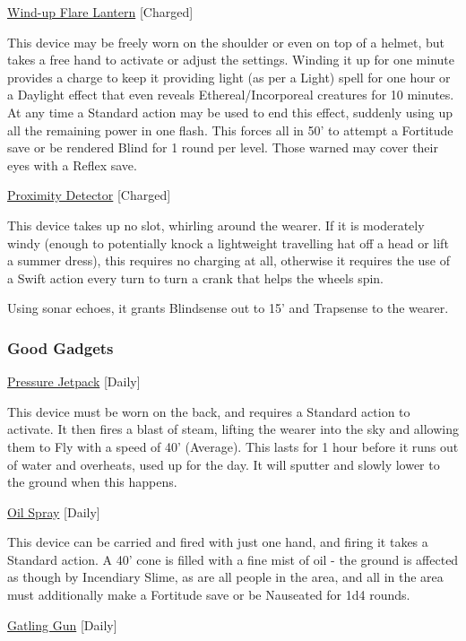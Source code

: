 \medskip\noindent\underline{Wind-up Flare Lantern} [Charged]

\noindent This device may be freely worn on the shoulder or even on top of a helmet, but takes a free hand to activate or adjust the settings. Winding it up for one minute provides a charge to keep it providing light (as per a Light) spell for one hour or a Daylight effect that even reveals Ethereal/Incorporeal creatures for 10 minutes. At any time a Standard action may be used to end this effect, suddenly using up all the remaining power in one flash. This forces all in 50' to attempt a Fortitude save or be rendered Blind for 1 round per level. Those warned may cover their eyes with a Reflex save.

\medskip\noindent\underline{Proximity Detector} [Charged]

\noindent This device takes up no slot, whirling around the wearer. If it is moderately windy (enough to potentially knock a lightweight travelling hat off a head or lift a summer dress), this requires no charging at all, otherwise it requires the use of a Swift action every turn to turn a crank that helps the wheels spin.

\smallskip\noindent Using sonar echoes, it grants Blindsense out to 15' and Trapsense to the wearer.

\subsubsection{Good Gadgets}

\noindent\underline{Pressure Jetpack} [Daily]

\noindent This device must be worn on the back, and requires a Standard action to activate. It then fires a blast of steam, lifting the wearer into the sky and allowing them to Fly with a speed of 40' (Average). This lasts for 1 hour before it runs out of water and overheats, used up for the day. It will sputter and slowly lower to the ground when this happens.

\medskip\noindent\underline{Oil Spray} [Daily]

\noindent This device can be carried and fired with just one hand, and firing it takes a Standard action. A 40' cone is filled with a fine mist of oil - the ground is affected as though by Incendiary Slime, as are all people in the area, and all in the area must additionally make a Fortitude save or be Nauseated for 1d4 rounds.

\medskip\noindent\underline{Gatling Gun} [Daily]

